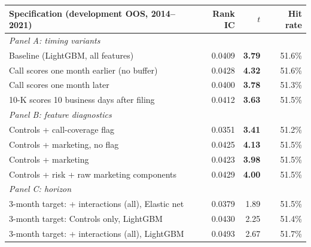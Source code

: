 \begin{tabular}{lrrr}
\toprule
Specification (development OOS, 2014--2021) & Rank IC & $t$ & Hit rate \\
\midrule
\multicolumn{4}{l}{\textit{Panel A: timing variants}} \\
Baseline (LightGBM, all features) & 0.0409 & \textbf{3.79} & 51.6\% \\
Call scores one month earlier (no buffer) & 0.0428 & \textbf{4.32} & 51.6\% \\
Call scores one month later & 0.0400 & \textbf{3.78} & 51.3\% \\
10-K scores 10 business days after filing & 0.0412 & \textbf{3.63} & 51.5\% \\
\midrule
\multicolumn{4}{l}{\textit{Panel B: feature diagnostics}} \\
Controls + call-coverage flag & 0.0351 & \textbf{3.41} & 51.2\% \\
Controls + marketing, no flag & 0.0425 & \textbf{4.13} & 51.5\% \\
Controls + marketing & 0.0423 & \textbf{3.98} & 51.5\% \\
Controls + risk + raw marketing components & 0.0429 & \textbf{4.00} & 51.5\% \\
\midrule
\multicolumn{4}{l}{\textit{Panel C: horizon}} \\
3-month target: + interactions (all), Elastic net & 0.0379 & 1.89 & 51.5\% \\
3-month target: Controls only, LightGBM & 0.0430 & 2.25 & 51.4\% \\
3-month target: + interactions (all), LightGBM & 0.0493 & 2.67 & 51.7\% \\
\bottomrule
\end{tabular}
